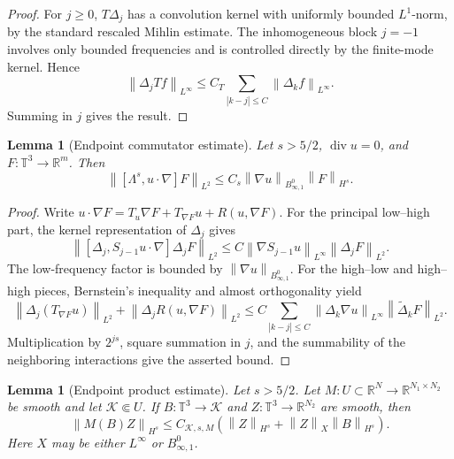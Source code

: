 \documentclass[10pt,a4paper]{amsart}
\numberwithin{equation}{section}
\newtheorem{lemma}[theorem]{Lemma}
\newcommand{\T}{\mathbb T}
\newcommand{\R}{\mathbb R}
\newcommand{\divv}{\operatorname{div}}
\newcommand{\norm}[1]{\left\lVert #1\right\rVert}
\begin{document}
\begin{proof}
For \(j\ge0\), \(T\Delta_j\) has a convolution kernel with uniformly bounded
\(L^1\)-norm, by the standard rescaled Mihlin estimate.  The inhomogeneous
block \(j=-1\) involves only bounded frequencies and is controlled directly
by the finite-mode kernel.  Hence
\[
  \norm{\Delta_jTf}_{L^\infty}
  \le
  C_T\sum_{|k-j|\le C}\norm{\Delta_kf}_{L^\infty}.
\]
Summing in \(j\) gives the result.
\end{proof}

\begin{lemma}[Endpoint commutator estimate]
\label{lem:appendix-commutator}
Let \(s>5/2\), \(\divv u=0\), and \(F:\T^3\to\R^m\).  Then
\[
  \norm{[\Lambda^s,u\cdot\nabla]F}_{L^2}
  \le
  C_s\norm{\nabla u}_{B^0_{\infty,1}}\norm{F}_{H^s}.
\]
\end{lemma}

\begin{proof}
Write \(u\cdot\nabla F=T_u\nabla F+T_{\nabla F}u+R(u,\nabla F)\).  For the
principal low--high part, the kernel representation of \(\Delta_j\) gives
\[
  \norm{[\Delta_j,S_{j-1}u\cdot\nabla]\Delta_jF}_{L^2}
  \le
  C\norm{\nabla S_{j-1}u}_{L^\infty}\norm{\Delta_jF}_{L^2}.
\]
The low-frequency factor is bounded by
\(\norm{\nabla u}_{B^0_{\infty,1}}\).  For the high--low and high--high
pieces, Bernstein's inequality and almost orthogonality yield
\[
  \norm{\Delta_j(T_{\nabla F}u)}_{L^2}
  +
  \norm{\Delta_jR(u,\nabla F)}_{L^2}
  \le
  C\sum_{|k-j|\le C}
  \norm{\Delta_k\nabla u}_{L^\infty}
  \norm{\widetilde\Delta_kF}_{L^2}.
\]
Multiplication by \(2^{js}\), square summation in \(j\), and the summability of
the neighboring interactions give the asserted bound.
\end{proof}

\begin{lemma}[Endpoint product estimate]
\label{lem:appendix-product}
Let \(s>5/2\).  Let \(M:U\subset\R^N\to\R^{N_1\times N_2}\) be smooth and let
\(\mathcal K\Subset U\).  If \(B:\T^3\to\mathcal K\) and
\(Z:\T^3\to\R^{N_2}\) are smooth, then
\[
  \norm{M(B)Z}_{H^s}
  \le
  C_{\mathcal K,s,M}
  \left(
  \norm{Z}_{H^s}
  +\norm{Z}_{X}\norm{B}_{H^s}
  \right).
\]
Here \(X\) may be either \(L^\infty\) or \(B^0_{\infty,1}\).
\end{lemma}
\end{document}
